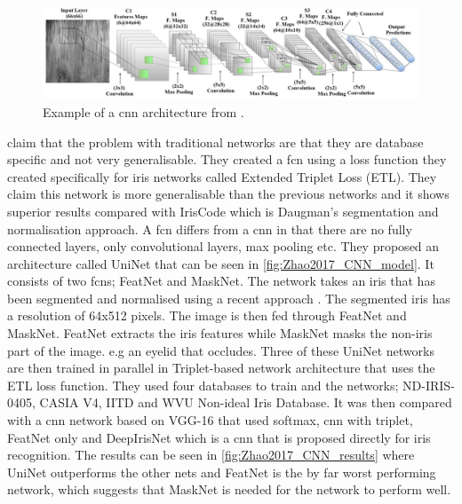 \begin{figure}[H]
\centering
\includegraphics[width=\textwidth]{figures/Al_Waisy2017_CNN_model} 
\caption{Example of a \gls{cnn} architecture  from \cite{Al-Waisy2017}.}
\label{fig:Al_Waisy2017_CNN_model}
\end{figure}


\cite{Zhao2017a} claim that the problem with traditional networks are that they are database specific and not very generalisable. They created a \gls{fcn} using a loss function they created specifically for iris networks called Extended Triplet Loss (ETL). They claim this network is more generalisable than the previous networks and it shows superior results compared with IrisCode which is Daugman's segmentation and normalisation approach. A \gls{fcn} differs from a \gls{cnn} in that there are no fully connected layers, only convolutional layers, max pooling etc. They proposed an architecture called UniNet that can be seen in \autoref{fig:Zhao2017_CNN_model}. It consists of two \gls{fcn}s; FeatNet and MaskNet. The network takes an iris that has been segmented and normalised using a recent approach \citep{Zhao2015a}. The segmented iris has a resolution of 64x512 pixels. The image is then fed through FeatNet and MaskNet. FeatNet extracts the iris features while MaskNet masks the non-iris part of the image. e.g an eyelid that occludes.  Three of these UniNet networks are then trained in parallel in Triplet-based network architecture that uses the ETL loss function. They used four databases to train and the networks; ND-IRIS-0405, CASIA V4, IITD and WVU Non-ideal Iris Database. It was then compared with a \gls{cnn} network based on VGG-16 that used softmax, \gls{cnn} with triplet, FeatNet only and DeepIrisNet which is a \gls{cnn} that is proposed directly for iris recognition. The results can be seen in \autoref{fig:Zhao2017_CNN_results} where UniNet outperforms the other nets and FeatNet is the by far worst performing network, which suggests that MaskNet is needed for the network to perform well. 

